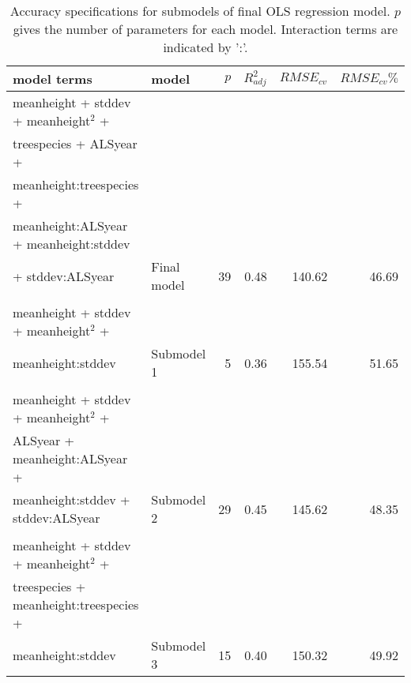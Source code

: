 \begin{table*}[!htbp]
	\centering
	\caption{Accuracy specifications for submodels of final OLS regression model. $p$ gives the number of parameters for each model. Interaction terms are indicated by ':'.} 
	\label{tab:regmod:mt}
	\begin{tabular}{llrrrr}
  \hline
model terms & model & $p$ & $R^2_{adj}$ & $RMSE_{cv}$ & $RMSE_{cv}\%$ \\ 
  \hline
  meanheight + stddev + meanheight$^2$ + \\ treespecies + ALSyear + \\ meanheight:treespecies + \\ meanheight:ALSyear + meanheight:stddev \\ + stddev:ALSyear & Final model &  39 & 0.48 & 140.62 & 46.69 \\ \\
  meanheight + stddev + meanheight$^2$ + \\ meanheight:stddev & Submodel 1 &   5 & 0.36 & 155.54 & 51.65 \\ \\
  meanheight + stddev + meanheight$^2$ + \\ ALSyear + meanheight:ALSyear + \\ meanheight:stddev + stddev:ALSyear & Submodel 2 &  29 & 0.45 & 145.62 & 48.35 \\ \\
  meanheight + stddev + meanheight$^2$ + \\ treespecies + meanheight:treespecies + \\ meanheight:stddev & Submodel 3 &  15 & 0.40 & 150.32 & 49.92 \\ 
   \hline
\hline
\end{tabular}
\end{table*}



